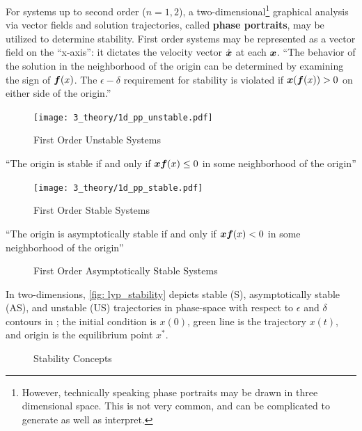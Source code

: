 \documentclass[12pt]{ucthesis}
\begin{document}
For systems up to second order ($n=1,2$), a two-dimensional\footnote{However, technically speaking phase portraits may be drawn in three dimensional space. This is not very common, and can be complicated to generate as well as interpret.} graphical analysis via vector fields and solution trajectories, called \textbf{phase portraits}, may be utilized to determine stability. First order systems may be represented as a vector field on the ``x-axis'': it dictates the velocity vector $\dot{\boldsymbol{x}}$ at each $\boldsymbol{x}$. ``The behavior of the solution in the neighborhood of the origin can be determined by examining the sign of $\boldsymbol{f}(x)$. The $\epsilon-\delta$ requirement for stability is violated if $\boldsymbol{x}(\boldsymbol{f}(x))>0$ on either side of the origin.'' %
%
	\begin{figure}[H] 
		\centering
		\texttt{[image: 3\_theory/1d\_pp\_unstable.pdf]}
		\caption{First Order Unstable Systems \citet[Online Lecture Notes]{Khalil1996}}
		\label{fig: pp_1d_unstable}
	\end{figure}
%
\noindent ``The origin is stable if and only if $\boldsymbol{x}\boldsymbol{f}(x)\leq 0$ in some neighborhood of the origin''
%
	\begin{figure}[H] 
		\centering
		\texttt{[image: 3\_theory/1d\_pp\_stable.pdf]}
		\caption{First Order Stable Systems \citet[Online Lecture Notes]{Khalil1996}}
		\label{fig: pp_1d_stable}
	\end{figure}
%
\noindent ``The origin is asymptotically stable if and only if $\boldsymbol{x}\boldsymbol{f}(x)< 0$ in some neighborhood of the origin''
%
	\begin{figure}[H]
		\centering
		\caption{First Order Asymptotically Stable Systems \citet[Online Lecture Notes]{Khalil1996}}
	\end{figure}
%
In two-dimensions, \autoref{fig: lyp_stability} depicts stable (S), asymptotically stable (AS), and unstable (US) trajectories in phase-space with respect to $\epsilon$ and $\delta$ contours in ; the initial condition is $x(0)$, green line is the trajectory $x(t)$, and origin is the equilibrium point $x^*$. 
%
	\begin{figure}[H]
		\centering
		 \hspace{1em}
		 \hspace{1em}
		\caption{Stability Concepts}
		\label{fig: lyp_stability}
	\end{figure}
\end{document}
